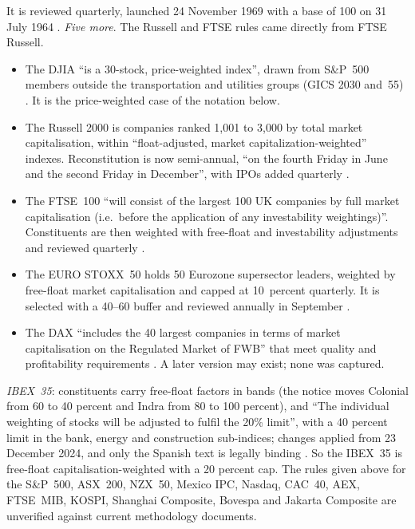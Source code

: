 \begin{qfdefinition}
It is reviewed quarterly, launched 24 November 1969 with a base of 100 on 31 July 1964 \citep[Hang Seng Index and Sub-indexes methodology, version~2.3 of July 2023, PDF pp.~3, 5 and~6--7]{hsi-methodology-2023}. \emph{Five more}. The Russell and FTSE rules came directly from FTSE Russell.
\begin{itemize}
\item The DJIA ``is a 30-stock, price-weighted index'', drawn from S\&P~500 members outside the transportation and utilities groups (GICS 2030 and~55) \citep[May 2026, ``Index Objective and Highlights'' and ``Eligibility Criteria'', PDF pp.~4--5; capture of 27 September 2026]{spdji-dj-averages-2026}. It is the price-weighted case of the notation below.
\item The Russell 2000 is companies ranked 1{,}001 to 3{,}000 by total market capitalisation, within ``float-adjusted, market capitalization-weighted'' indexes. Reconstitution is now semi-annual, ``on the fourth Friday in June and the second Friday in December'', with IPOs added quarterly \citep[v7.2, August 2026, secs.~1.1.1, 4.2.3 and~6.10, PDF pp.~3, 9 and~20]{russell-us-construction-2026}.
\item The FTSE~100 ``will consist of the largest 100 UK companies by full market capitalisation (i.e.\ before the application of any investability weightings)''. Constituents are then weighted with free-float and investability adjustments and reviewed quarterly \citep[v17.3, September 2026, secs.~6.4 and~7.1.1, PDF pp.~14 and~16]{ftse-uk-ground-rules-2026}.
\item The EURO STOXX~50 holds 50 Eurozone supersector leaders, weighted by free-float market capitalisation and capped at 10~percent quarterly. It is selected with a 40--60 buffer and reviewed annually in September \citep[Index Methodology Guide, October 2026, sec.~9.2, PDF pp.~100--101; capture of 16 October 2026]{stoxx-index-guide-2026}.
\item The DAX ``includes the 40 largest companies in terms of market capitalisation on the Regulated Market of FWB'' that meet quality and profitability requirements \citep[Guide to the DAX Equity Indices, version 11.3.0 of 3 August 2022, PDF p.~21; capture of 2 September 2025]{dax-guide-2022}. A later version may exist; none was captured.
\end{itemize}
\emph{IBEX~35}: constituents carry free-float factors in bands (the notice moves Colonial from 60 to 40 percent and Indra from 80 to 100 percent), and ``The individual weighting of stocks will be adjusted to fulfil the 20\% limit'', with a 40 percent limit in the bank, energy and construction sub-indices; changes applied from 23 December 2024, and only the Spanish text is legally binding \citep[Notice 18/2024, pp.~2--3]{bme-ibex-notice-18-2024}. So the IBEX~35 is free-float capitalisation-weighted with a 20 percent cap. The rules given above for the S\&P~500, ASX~200, NZX~50, Mexico IPC, Nasdaq, CAC~40, AEX, FTSE~MIB, KOSPI, Shanghai Composite, Bovespa and Jakarta Composite are unverified against current methodology documents.


\end{qfdefinition}
